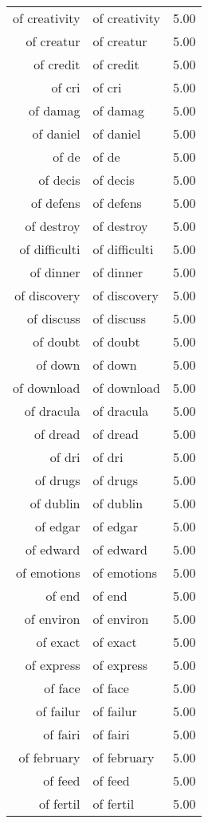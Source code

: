 \begin{table}[ht]
\begin{tabular}{rlr}
  of creativity & of creativity & 5.00 \\ 
  of creatur & of creatur & 5.00 \\ 
  of credit & of credit & 5.00 \\ 
  of cri & of cri & 5.00 \\ 
  of damag & of damag & 5.00 \\ 
  of daniel & of daniel & 5.00 \\ 
  of de & of de & 5.00 \\ 
  of decis & of decis & 5.00 \\ 
  of defens & of defens & 5.00 \\ 
  of destroy & of destroy & 5.00 \\ 
  of difficulti & of difficulti & 5.00 \\ 
  of dinner & of dinner & 5.00 \\ 
  of discovery & of discovery & 5.00 \\ 
  of discuss & of discuss & 5.00 \\ 
  of doubt & of doubt & 5.00 \\ 
  of down & of down & 5.00 \\ 
  of download & of download & 5.00 \\ 
  of dracula & of dracula & 5.00 \\ 
  of dread & of dread & 5.00 \\ 
  of dri & of dri & 5.00 \\ 
  of drugs & of drugs & 5.00 \\ 
  of dublin & of dublin & 5.00 \\ 
  of edgar & of edgar & 5.00 \\ 
  of edward & of edward & 5.00 \\ 
  of emotions & of emotions & 5.00 \\ 
  of end & of end & 5.00 \\ 
  of environ & of environ & 5.00 \\ 
  of exact & of exact & 5.00 \\ 
  of express & of express & 5.00 \\ 
  of face & of face & 5.00 \\ 
  of failur & of failur & 5.00 \\ 
  of fairi & of fairi & 5.00 \\ 
  of february & of february & 5.00 \\ 
  of feed & of feed & 5.00 \\ 
  of fertil & of fertil & 5.00 \\ 

\end{tabular}
\end{table}
